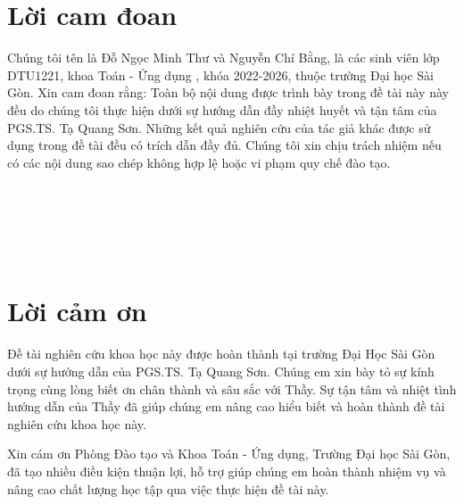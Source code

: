 \documentclass[12pt,a4paper]{report}
\begin{document}
	\renewcommand{\baselinestretch}{1.2}
	\fontsize{13pt}{20pt}\selectfont
	
    \chapter*{Lời cam đoan}
	\thispagestyle{fancy}
	\vspace{1cm}
	\indent
	
	Chúng tôi tên là Đỗ Ngọc Minh Thư và Nguyễn Chí Bằng, là các  sinh viên lớp DTU1221, khoa Toán - Ứng dụng , khóa 2022-2026,  thuộc trường Đại học Sài Gòn. 
	Xin cam đoan rằng: Toàn bộ nội dung được trình bày trong đề tài  này này đều do chúng tôi thực hiện dưới sự hướng dẫn đầy nhiệt huyết và tận tâm của PGS.TS. Tạ Quang Sơn.
	Những kết quả nghiên cứu của tác giả khác được sử dụng trong đề tài  đều có trích dẫn đầy đủ. 
	Chúng tôi xin chịu trách nhiệm nếu có các nội dung sao chép không hợp lệ hoặc vi phạm quy chế đào tạo. 
	\\
	\\
	\\
	\\
	\\
	\\
	
	
	\chapter*{Lời cảm ơn}
	\thispagestyle{fancy}
	\vspace{1cm}
	\indent
	
	Đề tài nghiên cứu khoa học này được hoàn thành tại trường Đại Học Sài Gòn dưới sự hướng dẫn của PGS.TS. Tạ Quang Sơn. Chúng em xin bày tỏ sự kính trọng cùng lòng biết ơn chân thành và sâu sắc với Thầy. Sự tận tâm và nhiệt tình hướng dẫn của Thầy đã giúp chúng em nâng cao hiểu biết và hoàn thành đề tài nghiên cứu khoa học này.
	
	
	\bigskip
	Xin cám ơn Phòng Đào tạo  và Khoa Toán - Ứng dụng, Trường Đại học Sài Gòn, đã tạo nhiều điều kiện thuận lợi, hỗ trợ giúp chúng em hoàn thành nhiệm vụ và nâng cao chất lượng học tập qua việc thực hiện đề tài này.
	\\
	\\
	\\
	\\
	\\
	
\end{document}
